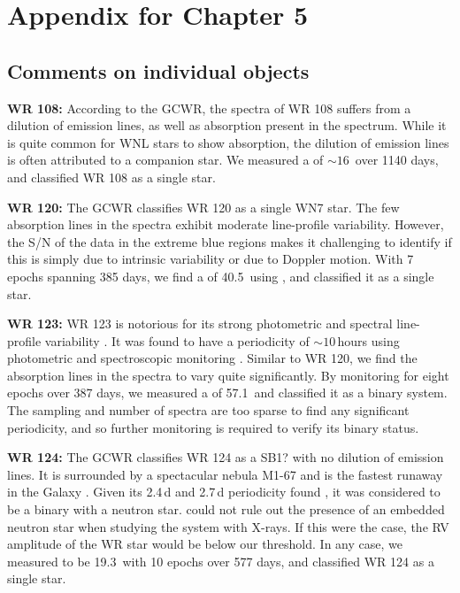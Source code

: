 \chapter{Appendix for Chapter 5}

\section{Comments on individual objects}\label{apdx:comments_WNL}
\textbf{WR 108:} According to the GCWR, the spectra of WR 108 suffers from a dilution of emission lines, as well as absorption present in the spectrum. While it is quite common for WNL stars to show absorption, the dilution of emission lines is often attributed to a companion star. We measured a \DelRV{} of ${\sim}16\,$\kms{} over 1140 days, and classified WR 108 as a single star. 

\textbf{WR 120:} The GCWR classifies WR 120 as a single WN7 star. The few absorption lines in the spectra exhibit moderate line-profile variability. However, the S/N of the data in the extreme blue regions makes it challenging to identify if this is simply due to intrinsic variability or due to Doppler motion. With 7 epochs spanning 385 days, we find a \DelRV{} of 40.5\,\kms{} using \niii{}, and classified it as a single star. 

\textbf{WR 123:} WR 123 is notorious for its strong photometric and spectral line-profile variability \citep{marchenko_time-frequency_1998}. It was found to have a periodicity of ${\sim}10\,$hours using photometric and spectroscopic monitoring \citep{lefevre_oscillations_2005,dorfi_most_2006,chene_10-h_2011}. Similar to WR 120, we find the absorption lines in the spectra to vary quite significantly. By monitoring \NVblue{} for eight epochs over 387 days, we measured a \DelRV{} of 57.1\,\kms{} and classified it as a binary system. The sampling and number of spectra are too sparse to find any significant periodicity, and so further monitoring is required to verify its binary status.

\textbf{WR 124:} The GCWR classifies WR 124 as a SB1? with no dilution of emission lines. It is surrounded by a spectacular nebula M1-67 and is the fastest runaway in the Galaxy \citep{moffat_fastest_1982}. Given its 2.4\,d and 2.7\,d periodicity found \citep{moffat_fastest_1982,moffat_photometric_1986}, it was considered to be a binary with a neutron star. \citet{toala_apparent_2018} could not rule out the presence of an embedded neutron star when studying the system with X-rays. If this were the case, the RV amplitude of the WR star would be below our threshold. In any case, we measured \DelRV{} to be 19.3\,\kms{} with 10 epochs over 577 days, and classified WR 124 as a single star.  

